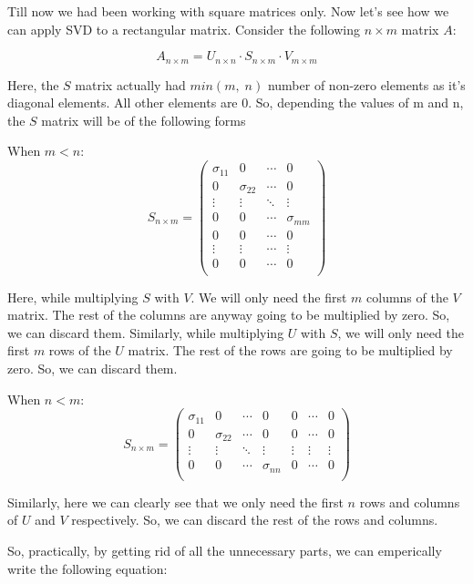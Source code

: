 		Till now we had been working with square matrices only. Now let's see how we can apply SVD to a rectangular matrix. Consider the following $n\times m$ matrix $A$:

		$$A_{n\times m} = U_{n\times n}\cdot S_{n\times m}\cdot V_{m\times m}$$

		Here, the $S$ matrix actually had $min(m,\;n)$ number of non-zero elements as it's diagonal elements. All other elements are 0. So, depending the values of m and n, the $S$ matrix will be of the following forms

		When $m<n$:
		$$
		S_{n\times m}=\left(
			\begin{matrix}
				\sigma_{11} & 0 & \cdots & 0 \\
				0 & \sigma_{22} & \cdots & 0 \\
				\vdots & \vdots & \ddots & \vdots \\
				0 & 0 & \cdots & \sigma_{mm} \\
				0 & 0 & \cdots & 0 \\
				\vdots & \vdots & \cdots & \vdots \\
				0 & 0 & \cdots & 0 \\
			\end{matrix}
		\right)
		$$

		Here, while multiplying $S$ with $V$. We will only need the first $m$ columns of the $V$ matrix. The rest of the columns are anyway going to be multiplied by zero. So, we can discard them. Similarly, while multiplying $U$ with $S$, we will only need the first $m$ rows of the $U$ matrix. The rest of the rows are going to be multiplied by zero. So, we can discard them.

		When $n<m$:
		$$
		S_{n\times m}=\left(
			\begin{matrix}
				\sigma_{11} & 0 & \cdots & 0 & 0 & \cdots & 0 \\
				0 & \sigma_{22} & \cdots & 0 & 0 & \cdots & 0 \\
				\vdots & \vdots & \ddots & \vdots & \vdots & \vdots & \vdots \\
				0 & 0 & \cdots & \sigma_{nn} & 0 & \cdots & 0 \\
			\end{matrix}
		\right)
		$$

		Similarly, here we can clearly see that we only need the first $n$ rows and columns of $U$ and $V$ respectively. So, we can discard the rest of the rows and columns.

		So, practically, by getting rid of all the unnecessary parts, we can emperically write the following equation:

